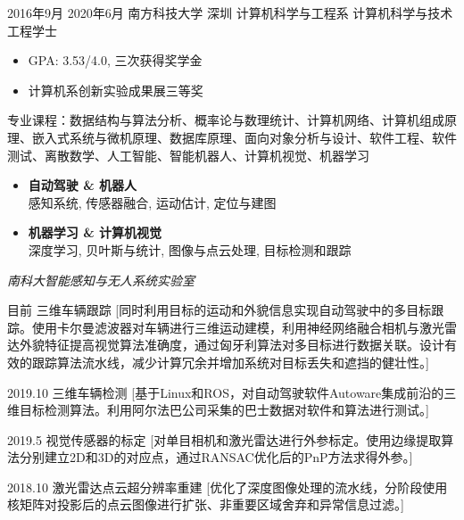 \documentclass[zh]{resume}
\begin{document}
\makeheader

\begin{educations}
  \education%
    {2016年9月}%
    {2020年6月}%
    {南方科技大学}%
    {深圳}%
    {计算机科学与工程系}%
    {计算机科学与技术}%
    {工程学士}%
	{\begin{itemize}%
		\item GPA: 3.53/4.0, 三次获得奖学金
		\item 计算机系创新实验成果展三等奖
	\end{itemize}
	专业课程：数据结构与算法分析、概率论与数理统计、计算机网络、计算机组成原理、嵌入式系统与微机原理、数据库原理、面向对象分析与设计、软件工程、软件测试、离散数学、人工智能、智能机器人、计算机视觉、机器学习
	}%
\end{educations}

\begin{itemize}
  \item \textbf{自动驾驶 \& 机器人}\\
  	感知系统, 传感器融合, 运动估计, 定位与建图
  \item \textbf{机器学习 \& 计算机视觉}\\
  	深度学习, 贝叶斯与统计, 图像与点云处理, 目标检测和跟踪
\end{itemize}


\textit{南科大智能感知与无人系统实验室}

\begin{experiences}
  \experience%
    {目前}%
    {三维车辆跟踪}%
    [同时利用目标的运动和外貌信息实现自动驾驶中的多目标跟踪。使用卡尔曼滤波器对车辆进行三维运动建模，利用神经网络融合相机与激光雷达外貌特征提高视觉算法准确度，通过匈牙利算法对多目标进行数据关联。设计有效的跟踪算法流水线，减少计算冗余并增加系统对目标丢失和遮挡的健壮性。]

\separator{0.5ex}
  \experience%
    {2019.10}%
    {三维车辆检测}%
    [基于Linux和ROS，对自动驾驶软件Autoware集成前沿的三维目标检测算法。利用阿尔法巴公司采集的巴士数据对软件和算法进行测试。] 

\separator{0.5ex}
  \experience%
    {2019.5}%
    {视觉传感器的标定}%
    [对单目相机和激光雷达进行外参标定。使用边缘提取算法分别建立2D和3D的对应点，通过RANSAC优化后的PnP方法求得外参。]

\separator{0.5ex}
  \experience%
    {2018.10}%
    {激光雷达点云超分辨率重建}%
    [优化了深度图像处理的流水线，分阶段使用核矩阵对投影后的点云图像进行扩张、非重要区域舍弃和异常信息过滤。]   
    

\end{experiences}
\end{document}
